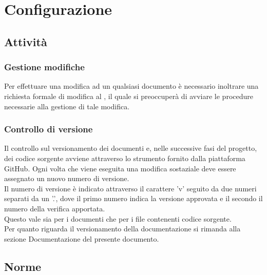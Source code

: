 \section{Configurazione}
	\subsection{Attività}
		\subsubsection{Gestione modifiche}
		Per effettuare una modifica ad un qualsiasi documento è necessario inoltrare una richiesta formale di modifica al , il quale si preoccuperà di avviare le procedure necessarie alla gestione di tale modifica.
		\subsubsection{Controllo di versione}
		Il controllo sul versionamento dei documenti e, nelle successive fasi del progetto, dei codice sorgente avviene attraverso lo strumento fornito dalla piattaforma GitHub.
		Ogni volta che viene eseguita una modifica sostaziale deve essere assegnato un nuovo numero di versione.\\ Il numero di versione è indicato attraverso il carattere 'v' seguito da due numeri separati da un '.', dove il primo numero indica la versione approvata e il secondo il numero della verifica apportata.\\ Questo vale sia per i documenti che per i file contenenti codice sorgente.\\
		Per quanto riguarda il versionamento della documentazione si rimanda alla sezione Documentazione del presente documento.
	\subsection{Norme}
